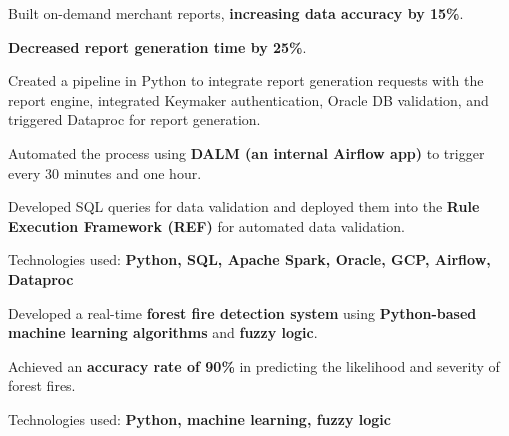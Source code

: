 \documentclass[letterpaper,10pt]{article}
\begin{document}
    \begin{resume_list}
        \vspace{5pt}
        \item Built on-demand merchant reports, \textbf{increasing data accuracy by 15\%}.
        \item \textbf{Decreased report generation time by 25\%}.
        \item Created a pipeline in Python to integrate report generation requests with the report engine, integrated Keymaker authentication, Oracle DB validation, and triggered Dataproc for report generation.
        \item Automated the process using \textbf{DALM (an internal Airflow app)} to trigger every 30 minutes and one hour.
        \item Developed SQL queries for data validation and deployed them into the \textbf{Rule Execution Framework (REF)} for automated data validation.
        \item Technologies used: \textbf{Python, SQL, Apache Spark, Oracle, GCP, Airflow, Dataproc}
    \end{resume_list}

\begin{resume_list}
    \vspace{5pt}
    \item Developed a real-time \textbf{forest fire detection system} using \textbf{Python-based machine learning algorithms} and \textbf{fuzzy logic}.
    \item Achieved an \textbf{accuracy rate of 90\%} in predicting the likelihood and severity of forest fires.
    \item Technologies used: \textbf{Python, machine learning, fuzzy logic}
\end{resume_list}


\end{document}
